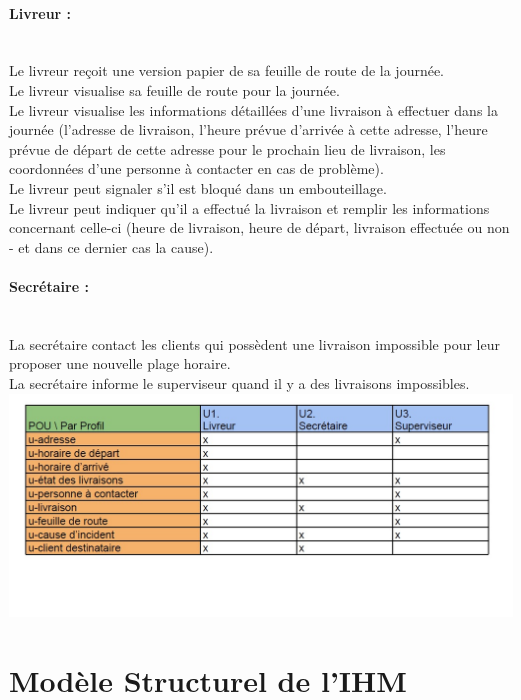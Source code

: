 \documentclass{report}
\begin{document}
\paragraph{Livreur :}
~~\\
Le livreur reçoit une version papier de sa feuille de route de la journée.\\
Le livreur visualise sa feuille de route pour la journée.\\
Le livreur visualise les informations détaillées d’une livraison à effectuer dans la journée (l’adresse de livraison, l’heure prévue d’arrivée à cette adresse, l’heure prévue de départ de cette adresse pour le prochain lieu de livraison, les coordonnées d’une personne à contacter en cas de problème).\\
Le livreur peut signaler s’il est bloqué dans un embouteillage.\\
Le livreur peut indiquer qu’il a effectué la livraison et remplir les informations concernant celle-ci (heure de livraison, heure de départ, livraison effectuée ou non - et dans ce dernier cas la cause).\\

\paragraph{Secrétaire :}
~~\\
La secrétaire contact les clients qui possèdent une livraison impossible pour leur proposer une nouvelle plage horaire.\\
La secrétaire informe le superviseur quand il y a des livraisons impossibles.\\

\includegraphics[scale = 0.5]{images/DICIHM.jpg}

\section{Modèle Structurel de l'IHM}
\end{document}
